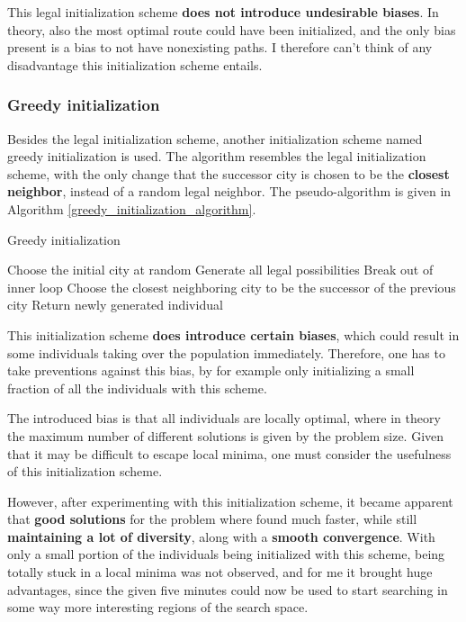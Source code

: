 \documentclass[a4paper,10pt]{article}
\begin{document}
This legal initialization scheme \textbf{does not introduce undesirable biases}. In theory, also the most optimal route could have been initialized, and the only bias present is a bias to not have nonexisting paths. I therefore can't think of any disadvantage this initialization scheme entails. 

\subsubsection{Greedy initialization}
\label{greedy_initialization}
Besides the legal initialization scheme, another initialization scheme named greedy initialization is used. The algorithm resembles the legal initialization scheme, with the only change that the successor city is chosen to be the \textbf{closest neighbor}, instead of a random legal neighbor. The pseudo-algorithm is given in Algorithm \ref{greedy_initialization_algorithm}.

\begin{algorithm}
\caption{Greedy initialization}\label{greedy_initialization_algorithm}
\begin{algorithmic}
\State Choose the initial city at random
\State Generate all legal possibilities
\State Break out of inner loop
\EndIf
\State Choose the closest neighboring city to be the successor of the previous city
\EndWhile
{}
\State Return newly generated individual
\EndIf
\EndWhile
\end{algorithmic}
\end{algorithm}

This initialization scheme \textbf{does introduce certain biases}, which could result in some individuals taking over the population immediately. Therefore, one has to take preventions against this bias, by for example only initializing a small fraction of all the individuals with this scheme.

The introduced bias is that all individuals are locally optimal, where in theory the maximum number of different solutions is given by the problem size. Given that it may be difficult to escape local minima, one must consider the usefulness of this initialization scheme.

However, after experimenting with this initialization scheme, it became apparent that \textbf{good solutions} for the problem where found much faster, while still \textbf{maintaining a lot of diversity}, along with a \textbf{smooth convergence}. With only a small portion of the individuals being initialized with this scheme, being totally stuck in a local minima was not observed, and for me it brought huge advantages, since the given five minutes could now be used to start searching in some way more interesting regions of the search space.
\end{document}

